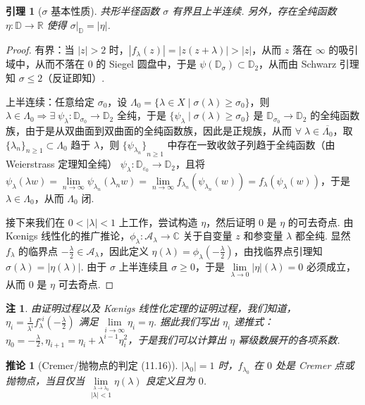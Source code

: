 \documentclass[11pt, a4paper, oneside]{ctexart}
\newtheorem{corollary}[theorem]{推论}
\newtheorem{lemma}[theorem]{引理}
\newtheorem{remark}[theorem]{注}
\newcommand{\C}{\mathbb{C}}
\newcommand{\D}{\mathbb{D}}
\newcommand{\R}{\mathbb{R}}
\newcommand{\cA}{\mathcal{A}}
\newcommand{\abs}[1]{\left|{#1}\right|}
\begin{document}
    \begin{lemma}[$\sigma$ 基本性质]
        共形半径函数 $\sigma$ 有界且上半连续. 另外，存在全纯函数 $\eta:\D\to \R$ 使得 $\sigma|_{\D}=\abs{\eta}$.
    \end{lemma}
    \begin{proof}
        有界：当 $\abs{z}>2$ 时，$\abs{f_{\lambda}(z)}=\abs{z(z+\lambda)}>\abs{z}$，从而 $z$ 落在 $\infty$ 的吸引域中，从而不落在 $0$ 的 Siegel 圆盘中，于是 $\psi(\D_{\sigma})\subset\D_2$，从而由 Schwarz 引理知 $\sigma\leq 2$（反证即知）.

        上半连续：任意给定 $\sigma_0$，设 $\Lambda_0=\{\lambda\in X\mid \sigma(\lambda)\geq \sigma_0\}$，则 $\lambda\in \Lambda_0\Rightarrow \exists\; \psi_{\lambda}:\D_{\sigma_0}\to \D_2$ 全纯，于是 $\{\psi_{\lambda}\mid \sigma(\lambda)\geq \sigma_0\}$ 是 $\D_{\sigma_0}\to \D_2$ 的全纯函数族，由于是从双曲面到双曲面的全纯函数族，因此是正规族，从而 $\forall\;\lambda\in \overline{\Lambda_0}$，取 ${\{\lambda_n\}}_{n\geq 1}\subset \Lambda_0$ 趋于 $\lambda$，则 ${\{\psi_{\lambda_n}\}}_{n\geq 1}$ 中存在一致收敛子列趋于全纯函数（由 Weierstrass 定理知全纯） $\psi_{\lambda}:\D_{\varepsilon_0}\to\D_2$，且将 $\psi_{\lambda}(\lambda w)=\lim\limits_{n\to\infty}\psi_{\lambda_n}(\lambda_n w)=\lim\limits_{n\to\infty}f_{\lambda_n}(\psi_{\lambda_n}(w))=f_{\lambda}(\psi_{\lambda}(w))$，于是 $\lambda\in\Lambda_0$，从而 $\Lambda_0$ 闭.

        接下来我们在 $0<\abs{\lambda}<1$ 上工作，尝试构造 $\eta$，然后证明 $0$ 是 $\eta$ 的可去奇点. 由 Kœnigs 线性化的推广推论，$\phi_{\lambda}:\cA_{\lambda}\to \C$ 关于自变量 $z$ 和参变量 $\lambda$ 都全纯. 显然 $f_{\lambda}$ 的临界点 $-\frac{\lambda}{2}\in\cA_{\lambda}$，因此定义 $\eta(\lambda)=\phi_{\lambda}(-\frac{\lambda}{2})$，由找临界点引理知 $\sigma(\lambda)=\abs{\eta(\lambda)}$. 由于 $\sigma$ 上半连续且 $\sigma\geq 0$，于是 $\lim\limits_{\lambda\to 0}\abs{\eta}(\lambda)=0$ 必须成立，从而 $0$ 是 $\eta$ 可去奇点.
    \end{proof}
    \begin{remark}
        由证明过程以及 Kœnigs 线性化定理的证明过程，我们知道，$\eta_i=\frac{1}{\lambda^i}f_{\lambda}^{\circ i}(-\frac{\lambda}{2})$ 满足 $\lim\limits_{i\to\infty}\eta_i=\eta$. 据此我们写出 $\eta_i$ 递推式：$\eta_0=-\frac{\lambda}{2},\eta_{i+1}=\eta_i+\lambda^{i-1}\eta_i^2$，于是我们可以计算出 $\eta$ 幂级数展开的各项系数.
    \end{remark}
    \begin{corollary}[Cremer/抛物点的判定 (11.16)]\label{推论11.16}
        $\abs{\lambda_0}=1$ 时，$f_{\lambda_0}$ 在 $0$ 处是 Cremer 点或抛物点，当且仅当 $\lim\limits_{\stackrel{\lambda\to\lambda_0}{\abs{\lambda}<1}}\eta(\lambda)$ 良定义且为 $0$.
    \end{corollary}
\end{document}
